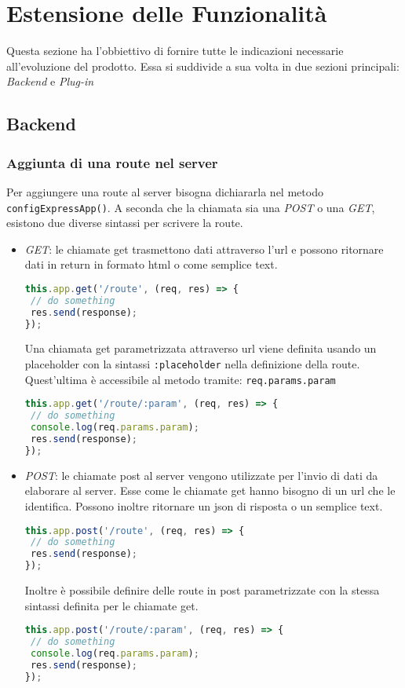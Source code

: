 \section{Estensione delle Funzionalità}\label{Estensione}
Questa sezione ha l'obbiettivo di fornire tutte le indicazioni necessarie all'evoluzione del prodotto. 
Essa si suddivide a sua volta in due sezioni principali: \textit{Backend} e \textit{Plug-in}

\subsection{Backend}\label{Estensione_Server}
\subsubsection{Aggiunta di una route nel server}
Per aggiungere una route al server bisogna dichiararla nel metodo \texttt{configExpressApp()}. 
A seconda che la chiamata sia una \textit{POST} o una \textit{GET}, esistono due diverse sintassi per scrivere la route.
\begin{itemize}
 \item \textit{GET}: le chiamate get trasmettono dati attraverso l'url e possono ritornare dati in return in formato html o come semplice text.
\begin{lstlisting}[language=JavaScript]
this.app.get('/route', (req, res) => {
 // do something
 res.send(response);
});
\end{lstlisting} 
Una chiamata get parametrizzata attraverso url viene definita usando un placeholder con la sintassi \texttt{:placeholder} nella definizione della route. Quest'ultima è accessibile al metodo tramite: \texttt{req.params.param}
\begin{lstlisting}[language=JavaScript]
this.app.get('/route/:param', (req, res) => {
 // do something
 console.log(req.params.param);
 res.send(response);
});
\end{lstlisting}
\item \textit{POST}: le chiamate post al server vengono utilizzate per l'invio di dati da elaborare al server. Esse come le chiamate get hanno bisogno di un url che le identifica. Possono inoltre ritornare un json di risposta o un semplice text. 
\begin{lstlisting}[language=JavaScript]
this.app.post('/route', (req, res) => {
 // do something
 res.send(response);
});
\end{lstlisting} 
Inoltre è possibile definire delle route in post parametrizzate con la stessa sintassi definita per le chiamate get. 
\begin{lstlisting}[language=JavaScript]
this.app.post('/route/:param', (req, res) => {
 // do something
 console.log(req.params.param);
 res.send(response);
});
\end{lstlisting}
\end{itemize}


